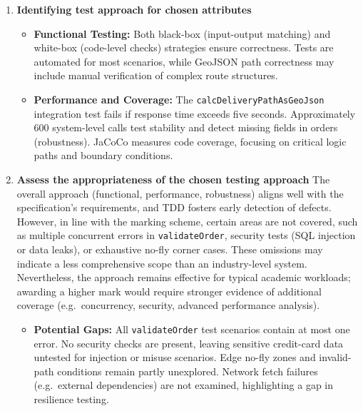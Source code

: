 \documentclass{article}
\begin{document}
\begin{enumerate}
\begin{enumerate}
        \item \textbf{Identifying test approach for chosen attributes}
        \begin{itemize}
            \item \textbf{Functional Testing:}
            Both black-box (input-output matching) and white-box (code-level checks) strategies ensure correctness. 
            Tests are automated for most scenarios, while GeoJSON path correctness may include manual verification of complex route structures.
            \item \textbf{Performance and Coverage:}
            The \texttt{calcDeliveryPathAsGeoJson} integration test fails if response time exceeds five seconds. 
            Approximately 600 system-level calls test stability and detect missing fields in orders (robustness). 
            JaCoCo measures code coverage, focusing on critical logic paths and boundary conditions.
        \end{itemize}
    
        \item \textbf{Assess the appropriateness of the chosen testing approach}
        The overall approach (functional, performance, robustness) aligns well with the specification’s requirements, and TDD fosters early detection of defects. 
        However, in line with the marking scheme, certain areas are not covered, such as multiple concurrent errors in \texttt{validateOrder}, security tests (SQL injection or data leaks), or exhaustive no-fly corner cases. 
        These omissions may indicate a less comprehensive scope than an industry-level system. 
        Nevertheless, the approach remains effective for typical academic workloads; awarding a higher mark would require stronger evidence of additional coverage (e.g.\ concurrency, security, advanced performance analysis).
        \begin{itemize}
            \item \textbf{Potential Gaps:}
            All \texttt{validateOrder} test scenarios contain at most one error. 
            No security checks are present, leaving sensitive credit-card data untested for injection or misuse scenarios. 
            Edge no-fly zones and invalid-path conditions remain partly unexplored. 
            Network fetch failures (e.g.\ external dependencies) are not examined, highlighting a gap in resilience testing.
        \end{itemize}
    \end{enumerate}


\end{enumerate}
\end{document}
